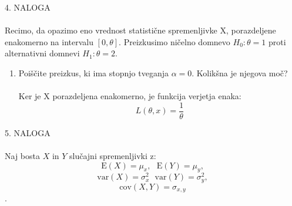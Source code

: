 \documentclass[a4paper]{article}
\begin{document}
\large{4. NALOGA} \\ \\
Recimo, da opazimo eno vrednost statistične spremenljivke X, porazdeljene enakomerno na intervalu $[0, \theta]$. Preizkusimo ničelno domnevo $H_0 : \theta = 1$ proti alternativni domnevi $H_1: \theta=2$.
\begin{enumerate}[label=(\alph*)]
\item Poiščite preizkus, ki ima stopnjo tveganja $\alpha = 0$. Kolikšna je njegova moč? \\ \\
Ker je X porazdeljena enakomerno, je funkcija verjetja enaka:
$$L(\theta, x) = \frac{1}{\theta}$$


\end{enumerate}

\large{5. NALOGA} \\ \\
Naj bosta $X$ in $Y$ slučajni spremenljivki z:
    \begin{equation*} \text{E}(X) = \mu_x, \ \ \  \text{E}(Y) = \mu_y, \end{equation*}
     \begin{equation*}\text{var}(X) = \sigma_x^2 \ \ \ \text{var}(Y) = \sigma_y^2, \end{equation*}
     \begin{equation*}\text{cov}(X,Y) = \sigma_{x,y} \end{equation*}.
\end{document}
